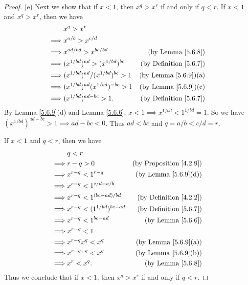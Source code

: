 \begin{proof}{(e)}
    Next we show that if \(x < 1\), then \(x^q > x^r\) if and only if \(q < r\).
    If \(x < 1\) and \(x^q > x^r\), then we have
    \begin{align*}
                 & x^q > x^r                                                                      \\
        \implies & x^{a / b} > x^{c / d}                                                          \\
        \implies & x^{ad / bd} > x^{bc / bd}                 & \text{(by Lemma \ref{5.6.8})}      \\
        \implies & (x^{1 / bd})^{ad} > (x^{1 / bd})^{bc}     & \text{(by Definition \ref{5.6.7})} \\
        \implies & (x^{1 / bd})^{ad} / (x^{1 / bd})^{bc} > 1 & \text{(by Lemma \ref{5.6.9})(a)}   \\
        \implies & (x^{1 / bd})^{ad} (x^{1 / bd})^{-bc} > 1  & \text{(by Lemma \ref{5.6.9})(c)}   \\
        \implies & (x^{1 / bd})^{ad - bc} > 1.               & \text{(by Definition \ref{5.6.7})}
    \end{align*}
    By Lemma \ref{5.6.9}(d) and Lemma \ref{5.6.6}, \(x < 1 \implies x^{1 / bd} < 1^{1 / bd} = 1\).
    So we have \((x^{1 / bd})^{ad - bc} > 1 \implies ad - bc < 0\).
    Thus \(ad < bc\) and \(q = a / b < c / d = r\).

    If \(x < 1\) and \(q < r\), then we have
    \begin{align*}
                 & q < r                                                                    \\
        \implies & r - q > 0                          & \text{(by Proposition \ref{4.2.9})} \\
        \implies & x^{r - q} < 1^{r - q}              & \text{(by Lemma \ref{5.6.9}(d))}    \\
        \implies & x^{r - q} < 1^{c / d - a / b}                                            \\
        \implies & x^{r - q} < 1^{(bc - ad) / bd}     & \text{(by Definition \ref{4.2.2})}  \\
        \implies & x^{r - q} < (1^{1 / bd})^{bc - ad} & \text{(by Definition \ref{5.6.7})}  \\
        \implies & x^{r - q} < 1^{bc - ad}            & \text{(by Lemma \ref{5.6.6})}       \\
        \implies & x^{r - q} < 1                                                            \\
        \implies & x^{r - q} x^q < x^q                & \text{(by Lemma \ref{5.6.9}(a))}    \\
        \implies & x^{r - q + q} < x^q                & \text{(by Lemma \ref{5.6.9}(b))}    \\
        \implies & x^r < x^q.                         & \text{(by Lemma \ref{5.6.8})}
    \end{align*}
    Thus we conclude that if \(x < 1\), then \(x^q > x^r\) if and only if \(q < r\).
\end{proof}

